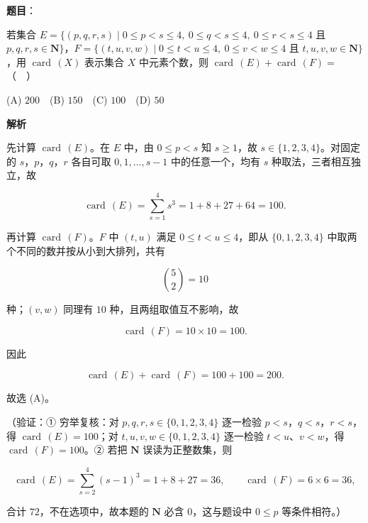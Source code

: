 \begin{answer}

\textbf{题目}：

若集合 \(E=\{(p,q,r,s)\mid 0\leqslant p<s\leqslant 4,\ 0\leqslant q<s\leqslant 4,\ 0\leqslant r<s\leqslant 4\) 且 \(p,q,r,s\in\mathbf{N}\}\)，\(F=\{(t,u,v,w)\mid 0\leqslant t<u\leqslant 4,\ 0\leqslant v<w\leqslant 4\) 且 \(t,u,v,w\in\mathbf{N}\}\)，用 \(\operatorname{card}\,(X)\) 表示集合 \(X\) 中元素个数，则 \(\operatorname{card}\,(E)+\operatorname{card}\,(F)=\)（　）

(A) \(200\)　(B) \(150\)　(C) \(100\)　(D) \(50\)

\textbf{解析}

先计算 \(\operatorname{card}\,(E)\)。在 \(E\) 中，由 \(0\leqslant p<s\) 知 \(s\geqslant 1\)，故 \(s\in\{1,2,3,4\}\)。对固定的 \(s\)，\(p\)，\(q\)，\(r\) 各自可取 \(0,1,\ldots,s-1\) 中的任意一个，均有 \(s\) 种取法，三者相互独立，故

\nopagebreak[4]
\[
\operatorname{card}\,(E)=\sum_{s=1}^{4}s^3=1+8+27+64=100.
\]

再计算 \(\operatorname{card}\,(F)\)。\(F\) 中 \((t,u)\) 满足 \(0\leqslant t<u\leqslant 4\)，即从 \(\{0,1,2,3,4\}\) 中取两个不同的数并按从小到大排列，共有

\nopagebreak[4]
\[
\binom{5}{2}=10
\]

种；\((v,w)\) 同理有 \(10\) 种，且两组取值互不影响，故

\nopagebreak[4]
\[
\operatorname{card}\,(F)=10\times 10=100.
\]

因此

\nopagebreak[4]
\[
\operatorname{card}\,(E)+\operatorname{card}\,(F)=100+100=200.
\]

故选 (A)。

（验证：① 穷举复核：对 \(p,q,r,s\in\{0,1,2,3,4\}\) 逐一检验 \(p<s\)，\(q<s\)，\(r<s\)，得 \(\operatorname{card}\,(E)=100\)；对 \(t,u,v,w\in\{0,1,2,3,4\}\) 逐一检验 \(t<u\)、\(v<w\)，得 \(\operatorname{card}\,(F)=100\)。② 若把 \(\mathbf{N}\) 误读为正整数集，则

\nopagebreak[4]
\[
\operatorname{card}\,(E)=\sum_{s=2}^{4}(s-1)^3=1+8+27=36,\qquad \operatorname{card}\,(F)=6\times 6=36,
\]

合计 \(72\)，不在选项中，故本题的 \(\mathbf{N}\) 必含 \(0\)，这与题设中 \(0\leqslant p\) 等条件相符。）


\end{answer}

